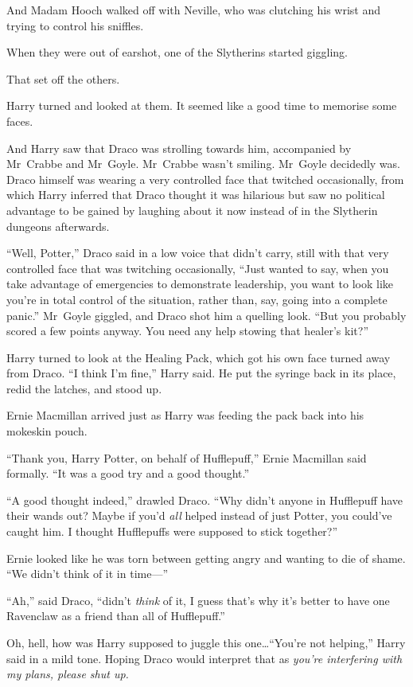 And Madam Hooch walked off with Neville, who was clutching his wrist and trying to control his sniffles.

When they were out of earshot, one of the Slytherins started giggling.

That set off the others.

Harry turned and looked at them. It seemed like a good time to memorise some faces.

And Harry saw that Draco was strolling towards him, accompanied by Mr~Crabbe and Mr~Goyle. Mr~Crabbe wasn’t smiling. Mr~Goyle decidedly was. Draco himself was wearing a very controlled face that twitched occasionally, from which Harry inferred that Draco thought it was hilarious but saw no political advantage to be gained by laughing about it now instead of in the Slytherin dungeons afterwards.

“Well, Potter,” Draco said in a low voice that didn’t carry, still with that very controlled face that was twitching occasionally, “Just wanted to say, when you take advantage of emergencies to demonstrate leadership, you want to look like you’re in total control of the situation, rather than, say, going into a complete panic.” Mr~Goyle giggled, and Draco shot him a quelling look. “But you probably scored a few points anyway. You need any help stowing that healer’s kit?”

Harry turned to look at the Healing Pack, which got his own face turned away from Draco. “I think I’m fine,” Harry said. He put the syringe back in its place, redid the latches, and stood up.

Ernie Macmillan arrived just as Harry was feeding the pack back into his mokeskin pouch.

“Thank you, Harry Potter, on behalf of Hufflepuff,” Ernie Macmillan said formally. “It was a good try and a good thought.”

“A good thought indeed,” drawled Draco. “Why didn’t anyone in Hufflepuff have their wands out? Maybe if you’d \emph{all} helped instead of just Potter, you could’ve caught him. I thought Hufflepuffs were supposed to stick together?”

Ernie looked like he was torn between getting angry and wanting to die of shame. “We didn’t think of it in time—”

“Ah,” said Draco, “didn’t \emph{think} of it, I guess that’s why it’s better to have one Ravenclaw as a friend than all of Hufflepuff.”

Oh, hell, how was Harry supposed to juggle this one…“You’re not helping,” Harry said in a mild tone. Hoping Draco would interpret that as \emph{you’re interfering with my plans, please shut up.}

